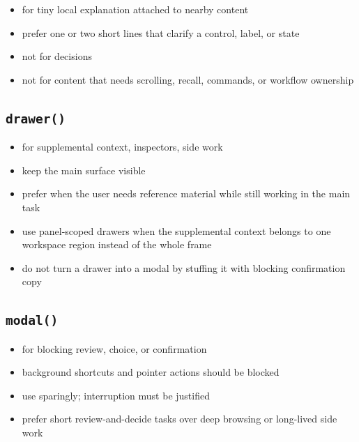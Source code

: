 \begin{itemize}
\tightlist
\item
  for tiny local explanation attached to nearby content
\item
  prefer one or two short lines that clarify a control, label, or state
\item
  not for decisions
\item
  not for content that needs scrolling, recall, commands, or workflow ownership
\end{itemize}

\subsection{\texorpdfstring{\texttt{d\allowbreak{}r\allowbreak{}a\allowbreak{}w\allowbreak{}e\allowbreak{}r\allowbreak{}(\allowbreak{})}}{}}\label{record-023-drawer}

\begin{itemize}
\tightlist
\item
  for supplemental context, inspectors, side work
\item
  keep the main surface visible
\item
  prefer when the user needs reference material while still working in the main task
\item
  use panel-scoped drawers when the supplemental context belongs to one workspace region instead of the whole frame
\item
  do not turn a drawer into a modal by stuffing it with blocking confirmation copy
\end{itemize}

\subsection{\texorpdfstring{\texttt{m\allowbreak{}o\allowbreak{}d\allowbreak{}a\allowbreak{}l\allowbreak{}(\allowbreak{})}}{}}\label{record-023-modal-1}

\begin{itemize}
\tightlist
\item
  for blocking review, choice, or confirmation
\item
  background shortcuts and pointer actions should be blocked
\item
  use sparingly; interruption must be justified
\item
  prefer short review-and-decide tasks over deep browsing or long-lived side work
\end{itemize}

